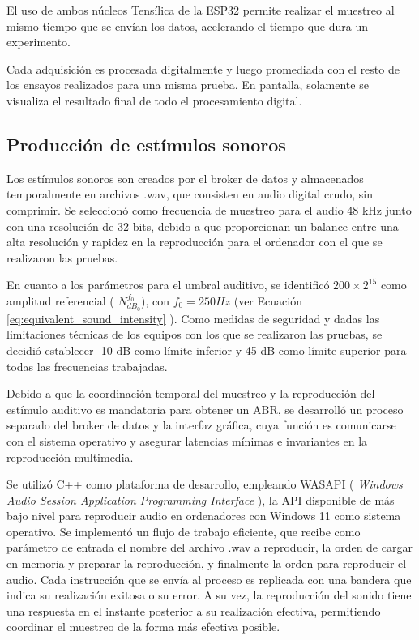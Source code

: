 El uso de ambos núcleos Tensílica de la ESP32 permite realizar el muestreo al mismo tiempo que se envían los datos,
acelerando el tiempo que dura un experimento.

Cada adquisición es procesada digitalmente y luego promediada con el resto de los ensayos realizados para una misma
prueba. En pantalla, solamente se visualiza el resultado final de todo el procesamiento digital.

\subsection{Producción de estímulos sonoros}

Los estímulos sonoros son creados por el broker de datos y almacenados temporalmente en archivos .wav, que consisten en
audio digital crudo, sin comprimir. Se seleccionó como frecuencia de muestreo para el audio 48 kHz junto con una
resolución de 32 bits, debido a que proporcionan un balance entre una alta resolución y rapidez en la reproducción para
el ordenador con el que se realizaron las pruebas.

En cuanto a los parámetros para el umbral auditivo, se identificó $200 \times 2 ^ {15}$ como amplitud referencial (
$N_{dB_0}^{f_0}$), con $f_0 = 250Hz$ (ver Ecuación \ref{eq:equivalent_sound_intensity}
). Como medidas de seguridad y dadas las limitaciones técnicas de los equipos con los que se realizaron las pruebas, se
decidió establecer -10 dB como límite inferior y 45 dB como límite superior para todas las frecuencias trabajadas.

Debido a que la coordinación temporal del muestreo y la reproducción del estímulo auditivo es mandatoria para obtener un
ABR, se desarrolló un proceso separado del broker de datos y la interfaz gráfica, cuya función es comunicarse con el
sistema operativo y asegurar latencias mínimas e invariantes en la reproducción multimedia.

Se utilizó C++ como plataforma de desarrollo, empleando WASAPI (
\textit{Windows Audio Session Application Programming Interface}
), la API disponible de más bajo nivel para reproducir audio en ordenadores con Windows 11 como sistema operativo. Se
implementó un flujo de trabajo eficiente, que recibe como parámetro de entrada el nombre del archivo .wav a reproducir,
la orden de cargar en memoria y preparar la reproducción, y finalmente la orden para reproducir el audio. Cada
instrucción que se envía al proceso es replicada con una bandera que indica su realización exitosa o su error. A su vez,
la reproducción del sonido tiene una respuesta en el instante posterior a su realización efectiva, permitiendo coordinar
el muestreo de la forma más efectiva posible.

